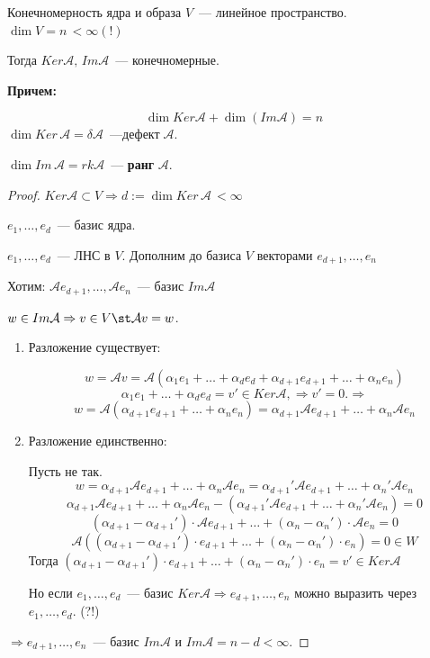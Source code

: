\begin{Proposition}{Конечномерность ядра и образа}{}
    $V$~--- линейное пространство. $\dim V = n \, < \infty (!)$

    Тогда $Ker \mathcal{A}, \, Im \mathcal{A}$~--- конечномерные.

    \textbf{Причем:}

    \[
    \dim Ker \mathcal{A} + \dim (Im \mathcal{A}) = n
    \]
    $\dim Ker \, \mathcal{A} = \delta \mathcal{A}$~---$\textbf{дефект} \; \mathcal{A}$.

    $\dim Im \,\mathcal{A} = rk \mathcal{A}$~--- \textbf{ранг} \; $\mathcal{A}$.
\end{Proposition}

\begin{proof}

    $Ker \mathcal{A} \subset V \Rightarrow d := \dim Ker \, \mathcal{A} \, < \infty$

    $e_1, \ldots, e_d$~--- базис ядра.

    $e_1, \ldots, e_d$~--- ЛНС в $V$. Дополним до базиса $V$ векторами $e_{d+1}, \ldots, e_{n}$

    Хотим: $\mathcal{A}e_{d+1}, \ldots, \mathcal{A}e_{n}$~--- базис $Im \mathcal{A}$

    $w \in Im \mathcal{A} \Rightarrow v \in V \st \mathcal{A}v = w$.

    \begin{enumerate}
        \item Разложение существует:
        
        \[ w = \mathcal{A}v = \mathcal{A}(\alpha_1 e_1 + \ldots + \alpha_d e_d + \alpha_{d+1} e_{d+1} + \ldots + \alpha_n e_n) \]
        \[ \alpha_1 e_1 + \ldots + \alpha_d e_d = v' \in Ker \mathcal{A}, \Rightarrow v' = 0. \Rightarrow \]
        \[ w = \mathcal{A}(\alpha_{d+1} e_{d+1} + \ldots + \alpha_n e_n) = \alpha_{d+1} \mathcal{A} e_{d+1} + \ldots + \alpha_n \mathcal{A} e_n \]

        \item Разложение единственно:
        
        Пусть не так.        
        \[ w = \alpha_{d+1} \mathcal{A} e_{d+1} + \ldots + \alpha_n \mathcal{A} e_n = \alpha_{d+1}' \mathcal{A} e_{d+1} + \ldots + \alpha_n' \mathcal{A} e_n \]
        \[ \alpha_{d+1} \mathcal{A} e_{d+1} + \ldots + \alpha_n \mathcal{A} e_n - (\alpha_{d+1}' \mathcal{A} e_{d+1} + \ldots + \alpha_n' \mathcal{A} e_n) = 0 \]
        \[ (\alpha_{d+1} - \alpha_{d+1}') \cdot \mathcal{A} e_{d+1} + \ldots + (\alpha_n - \alpha_n') \cdot \mathcal{A} e_n = 0 \]
        \[ \mathcal{A} \left( (\alpha_{d+1} - \alpha_{d+1}') \cdot e_{d+1} + \ldots + (\alpha_n - \alpha_n') \cdot e_n \right) = 0 \in W \]
        Тогда $(\alpha_{d+1} - \alpha_{d+1}') \cdot e_{d+1} + \ldots + (\alpha_n - \alpha_n') \cdot e_n = v' \in Ker \mathcal{A}$

        Но если $e_1, \ldots, e_d$~--- базис $Ker \mathcal{A} \Rightarrow e_{d+1}, \ldots, e_n$ можно выразить через $e_1, \ldots, e_d$. (?!)
    \end{enumerate}
    
    $\Rightarrow e_{d+1}, \ldots, e_n$~--- базис $Im \mathcal{A}$ и $Im \mathcal{A} = n - d < \infty$.
\end{proof}

